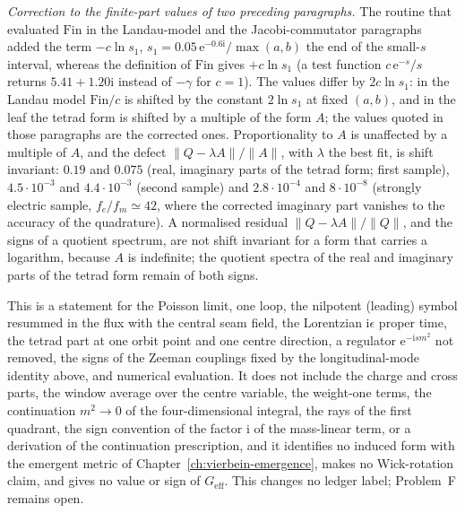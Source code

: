 \emph{Correction to the finite-part values of two preceding paragraphs.} The routine that evaluated \(\mathrm{Fin}\) in the Landau-model and the Jacobi-commutator paragraphs added the term \(-c\ln s_1\), \(s_1=0.05\,\mathrm e^{-0.6\mathrm i}/\max(a,b)\) the end of the small-\(s\) interval, whereas the definition of \(\mathrm{Fin}\) gives \(+c\ln s_1\) (a test function \(c\,\mathrm e^{-s}/s\) returns \(5.41+1.20\mathrm i\) instead of \(-\gamma\) for \(c=1\)). The values differ by \(2c\ln s_1\): in the Landau model \(\mathrm{Fin}/c\) is shifted by the constant \(2\ln s_1\) at fixed \((a,b)\), and in the leaf the tetrad form is shifted by a multiple of the form \(A\); the values quoted in those paragraphs are the corrected ones. Proportionality to \(A\) is unaffected by a multiple of \(A\), and the defect \(\|Q-\lambda A\|/\|A\|\), with \(\lambda\) the best fit, is shift invariant: \(0.19\) and \(0.075\) (real, imaginary parts of the tetrad form; first sample), \(4.5\cdot10^{-3}\) and \(4.4\cdot10^{-3}\) (second sample) and \(2.8\cdot10^{-4}\) and \(8\cdot10^{-8}\) (strongly electric sample, \(f_e/f_m\simeq42\), where the corrected imaginary part vanishes to the accuracy of the quadrature). A normalised residual \(\|Q-\lambda A\|/\|Q\|\), and the signs of a quotient spectrum, are not shift invariant for a form that carries a logarithm, because \(A\) is indefinite; the quotient spectra of the real and imaginary parts of the tetrad form remain of both signs.

This is a statement for the Poisson limit, one loop, the nilpotent (leading) symbol resummed in the flux with the central seam field, the Lorentzian \(\mathrm i\epsilon\) proper time, the tetrad part at one orbit point and one centre direction, a regulator \(\mathrm e^{-\mathrm ism^2}\) not removed, the signs of the Zeeman couplings fixed by the longitudinal-mode identity above, and numerical evaluation. It does not include the charge and cross parts, the window average over the centre variable, the weight-one terms, the continuation \(m^2\to0\) of the four-dimensional integral, the rays of the first quadrant, the sign convention of the factor \(\mathrm i\) of the mass-linear term, or a derivation of the continuation prescription, and it identifies no induced form with the emergent metric of Chapter~\ref{ch:vierbein-emergence}, makes no Wick-rotation claim, and gives no value or sign of \(G_{\mathrm{eff}}\). This changes no ledger label; Problem~F remains open.

